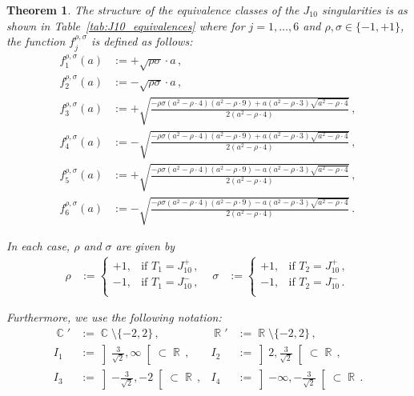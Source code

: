 \documentclass[noend]{amsproc}
\newtheorem{theorem}{Theorem}
\theoremstyle{definition}
\DeclareMathOperator{\R}{\mathbb{R}}
\DeclareMathOperator{\C}{\mathbb{C}}
\begin{document}
\begin{theorem}\label{tab:J10_equivalences_2}\label{thm:J10}
The structure of the equivalence classes of the $J_{10}$ singularities is as
shown in Table~\ref{tab:J10_equivalences} where for $j = 1, \ldots, 6$ and
$\rho, \sigma \in \{-1, +1\}$, the function $f_j^{\rho, \sigma}$ is defined as
follows:
\begin{align*}
f_1^{\rho, \sigma}(a) &:= +\sqrt{\rho \sigma} \cdot a \,, \\
f_2^{\rho, \sigma}(a) &:= -\sqrt{\rho \sigma} \cdot a \,, \\
f_3^{\rho, \sigma}(a)
&:= + \sqrt{\frac{-\rho \sigma (a^2-\rho \cdot 4) (a^2-\rho \cdot 9)
    + a (a^2-\rho \cdot 3) \sqrt{a^2-\rho \cdot 4}}{2(a^2-\rho \cdot 4)}}\,, \\
f_4^{\rho, \sigma}(a)
&:= - \sqrt{\frac{-\rho \sigma (a^2-\rho \cdot 4) (a^2-\rho \cdot 9)
    + a (a^2-\rho \cdot 3) \sqrt{a^2-\rho \cdot 4}}{2(a^2-\rho \cdot 4)}}\,, \\
f_5^{\rho, \sigma}(a)
&:= + \sqrt{\frac{-\rho \sigma (a^2-\rho \cdot 4) (a^2-\rho \cdot 9)
    - a (a^2-\rho \cdot 3) \sqrt{a^2-\rho \cdot 4}}{2(a^2-\rho \cdot 4)}}\,, \\
f_6^{\rho, \sigma}(a)
&:= - \sqrt{\frac{-\rho \sigma (a^2-\rho \cdot 4) (a^2-\rho \cdot 9)
    - a (a^2-\rho \cdot 3) \sqrt{a^2-\rho \cdot 4}}{2(a^2-\rho \cdot 4)}}\,.
\end{align*}

In each case, $\rho$ and $\sigma$ are given by
\begin{align*}
\rho &:=
\begin{cases}
    +1, &\text{if } T_1 = J_{10}^+ \,, \\
    -1, &\text{if } T_1 = J_{10}^- \,, \\
\end{cases}
&\sigma &:=
\begin{cases}
    +1, &\text{if } T_2 = J_{10}^+ \,, \\
    -1, &\text{if } T_2 = J_{10}^- \,. \\
\end{cases}
\end{align*}

Furthermore, we use the following notation:
\begin{align*}
\C'  &:= \C \setminus \{ -2, 2\}         \,, &
\R'  &:= \R \setminus \{ -2, 2\}         \,, \\
I_1 &:= \left] {\textstyle\frac{3}{\sqrt{2}}}, \infty \right[ \subset \R \,, &
I_2 &:= \left] 2, {\textstyle\frac{3}{\sqrt{2}}} \right[ \subset \R      \,, \\
I_3 &:= \left] {\textstyle-\frac{3}{\sqrt{2}}}, -2 \right[ \subset \R    \,, &
I_4 &:= \left] -\infty, {\textstyle-\frac{3}{\sqrt{2}}} \right[ \subset \R \,.
\end{align*}


\end{theorem}
\end{document}
